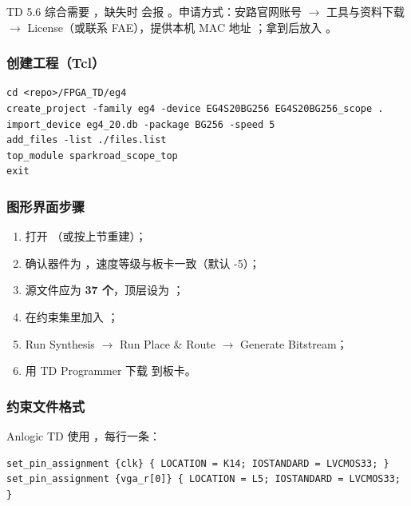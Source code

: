 TD 5.6 综合需要 ，缺失时  会报
。申请方式：安路官网账号 $\rightarrow$ 工具与资料下载
$\rightarrow$ License（或联系 FAE），提供本机 MAC 地址
；拿到后放入
。

\subsubsection{创建工程（Tcl）}

\begin{lstlisting}[style=vsnip]
cd <repo>/FPGA_TD/eg4
create_project -family eg4 -device EG4S20BG256 EG4S20BG256_scope .
import_device eg4_20.db -package BG256 -speed 5
add_files -list ./files.list
top_module sparkroad_scope_top
exit
\end{lstlisting}

\subsubsection{图形界面步骤}

\begin{enumerate}[leftmargin=2em,itemsep=2pt]
  \item 打开 （或按上节重建）；
  \item 确认器件为 ，速度等级与板卡一致（默认 -5）；
  \item 源文件应为 \textbf{37 个}，顶层设为 ；
  \item 在约束集里加入 ；
  \item Run Synthesis $\rightarrow$ Run Place \& Route $\rightarrow$ Generate Bitstream；
  \item 用 TD Programmer 下载  到板卡。
\end{enumerate}

\subsubsection{约束文件格式}

Anlogic TD 使用 ，每行一条：

\begin{lstlisting}[style=vsnip]
set_pin_assignment {clk} { LOCATION = K14; IOSTANDARD = LVCMOS33; }
set_pin_assignment {vga_r[0]} { LOCATION = L5; IOSTANDARD = LVCMOS33; }
\end{lstlisting}

